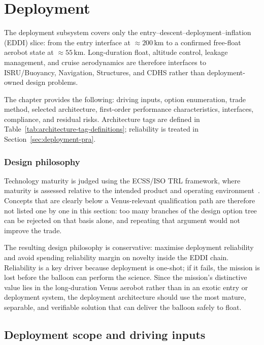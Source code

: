 \chapter{Deployment}
\label{ch:deployment}

The deployment subsystem covers only the entry--descent--deployment--inflation (EDDI) slice: from the entry interface at $\approx 200\,\mathrm{km}$ to a confirmed free-float aerobot state at $\approx 55\,\mathrm{km}$. Long-duration float, altitude control, leakage management, and cruise aerodynamics are therefore interfaces to ISRU/Buoyancy, Navigation, Structures, and CDHS rather than deployment-owned design problems.

The chapter provides the following: driving inputs, option enumeration, trade method, selected architecture, first-order performance characteristics, interfaces, compliance, and residual risks. Architecture tags are defined in Table~\ref{tab:architecture-tag-definitions}; reliability is treated in Section~\ref{sec:deployment-pra}.

\subsection*{Design philosophy}
\label{sec:7-1-1}

Technology maturity is judged using the ECSS/ISO TRL framework, where maturity is assessed relative to the intended product and operating environment~\cite{ECSS_E_HB_11A_2017}. Concepts that are clearly below a Venus-relevant qualification path are therefore not listed one by one in this section: too many branches of the design option tree can be rejected on that basis alone, and repeating that argument would not improve the trade.

The resulting design philosophy is conservative: maximise deployment reliability and avoid spending reliability margin on novelty inside the EDDI chain. Reliability is a key driver because deployment is one-shot; if it fails, the mission is lost before the balloon can perform the science. Since the mission's distinctive value lies in the long-duration Venus aerobot rather than in an exotic entry or deployment system, the deployment architecture should use the most mature, separable, and verifiable solution that can deliver the balloon safely to float.

\section{Deployment scope and driving inputs}
\label{sec:dep-reqs}

